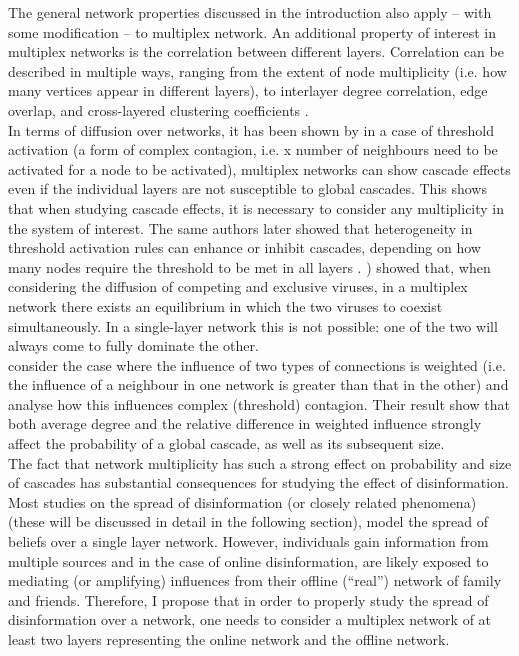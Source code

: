 The general network properties discussed in the introduction also apply – with some modification – to multiplex network. An additional property of interest in multiplex networks is the correlation between different layers. Correlation can be described in multiple ways, ranging from the extent of node multiplicity (i.e. how many vertices appear in different layers), to interlayer degree correlation, edge overlap, and cross-layered clustering coefficients \citep{Lee2015}. \\

In terms of diffusion over networks, it has been shown by \cite{Brummitt2012} in a case of threshold activation (a form of complex contagion, i.e. x number of neighbours need to be activated for a node to be activated), multiplex networks can show cascade effects even if the individual layers are not susceptible to global cascades. This shows that when studying cascade effects, it is necessary to consider any multiplicity in the system of interest. The same authors later showed that heterogeneity in threshold activation rules can enhance or inhibit cascades, depending on how many nodes require the threshold to be met in all layers \citep{Lee2014}. \cite{Sahneh2014}) showed that, when considering the diffusion of competing and exclusive viruses, in a multiplex network there exists an equilibrium in which the two viruses to coexist simultaneously. In a single-layer network this is not possible: one of the two will always come to fully dominate the other. \\

\cite{Yagan2012} consider the case where the influence of two types of connections is weighted (i.e. the influence of a neighbour in one network is greater than that in the other) and analyse how this influences complex (threshold) contagion.  Their result show that both average degree and the relative difference in weighted influence strongly affect the probability of a global cascade, as well as its subsequent size. \\

The fact that network multiplicity has such a strong effect on probability and size of cascades has substantial consequences for studying the effect of disinformation. Most studies on the spread of disinformation (or closely related phenomena) (these will be discussed in detail in the following section), model the spread of beliefs over a single layer network. However, individuals gain information from multiple sources and in the case of online disinformation, are likely exposed to mediating (or amplifying) influences from their offline (“real”) network of family and friends. Therefore, I propose that in order to properly study the spread of disinformation over a network, one needs to consider a multiplex network of at least two layers representing the online network and the offline network. 


